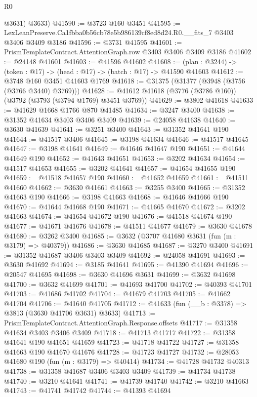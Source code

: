 \begin{lexlean}{R0}
\begin{coremodule}
        @3631)
      @3633)
@41590 := @3723 @160 @3451
@41595 := LexLeanPreserve.Ca1fbba0b56cb78e5b986139cf8ed8d24.R0.__fits_7 @3403 @3406 @3409 @3186
@41596 := @3731 @41595
@41601 := PrismTemplateContract.AttentionGraph.row @3403 @3406 @3409 @3186
@41602 := @24148 @41601
@41603 := @41596 @41602
@41608 := (plan : @3244) -> (token : @17) -> (head : @17) -> (batch : @17) -> @41590 @41603
@41612 := @3748 @160 @3451 @41603 @1769
@41618 := @31375 (@31377 (@3948 (@3756 (@3766 @3440) @3769)))
@41628 := @41612 @41618 (@3776 (@3786 @160)) (@3792 (@3793 (@3794 @1769) @3451 @3769))
@41629 := @3802 @41618
@41633 := @41629 @1668 @1766 @870 @41485
@41634 := @3247 @3400
@41638 := @31352 @41634 @3403 @3406 @3409
@41639 := @24058 @41638
@41640 := @3630 @41639
@41641 := @3251 @3400
@41643 := @31352 @41641 @190
@41644 := @41517 @3406
@41645 := @3198 @41634
@41646 := @41517 @41645
@41647 := @3198 @41641
@41649 := @41646 @41647 @190
@41651 := @41644 @41649 @190
@41652 := @41643 @41651
@41653 := @3202 @41634
@41654 := @41517 @41653
@41655 := @3202 @41641
@41657 := @41654 @41655 @190
@41659 := @41518 @41657 @190
@41660 := @41652 @41659
@41661 := @41511 @41660
@41662 := @3630 @41661
@41663 := @3255 @3400
@41665 := @31352 @41663 @190
@41666 := @3198 @41663
@41668 := @41646 @41666 @190
@41670 := @41644 @41668 @190
@41671 := @41665 @41670
@41672 := @3202 @41663
@41674 := @41654 @41672 @190
@41676 := @41518 @41674 @190
@41677 := @41671 @41676
@41678 := @41511 @41677
@41679 := @3630 @41678
@41680 := @3262 @3400
@41685 := @3632 (@3707 @41680 @3631 (fun (m : @3179) => @40379))
@41686 := @3630 @41685
@41687 := @3270 @3400
@41691 := @31352 @41687 @3406 @3403 @3409
@41692 := @24058 @41691
@41693 := @3630 @41692
@41694 := @3185 @41641
@41695 := @41390 @41694
@41696 := @20547 @41695
@41698 := @3630 @41696 @3631
@41699 := @3632 @41698
@41700 := @3632 @41699
@41701 := @41693 @41700
@41702 := @40393 @41701
@41703 := @41686 @41702
@41704 := @41679 @41703
@41705 := @41662 @41704
@41706 := @41640 @41705
@41712 := @41633 (fun (__b : @3378) => @3813 (@3630 @41706 @3631) @3633)
@41713 := PrismTemplateContract.AttentionGraph.Response.offsets
@41717 := @31358 @41634 @3403 @3406 @3409
@41718 := @41713 @41717
@41722 := @31358 @41641 @190 @41651 @41659
@41723 := @41718 @41722
@41727 := @31358 @41663 @190 @41670 @41676
@41728 := @41723 @41727
@41732 := @28053 @41680 @190 (fun (m : @3179) => @40414)
@41734 := @41728 @41732 @40313
@41738 := @31358 @41687 @3406 @3403 @3409
@41739 := @41734 @41738
@41740 := @3210 @41641
@41741 := @41739 @41740
@41742 := @3210 @41663
@41743 := @41741 @41742
@41744 := @41393 @41694

\end{coremodule}
\end{lexlean}
